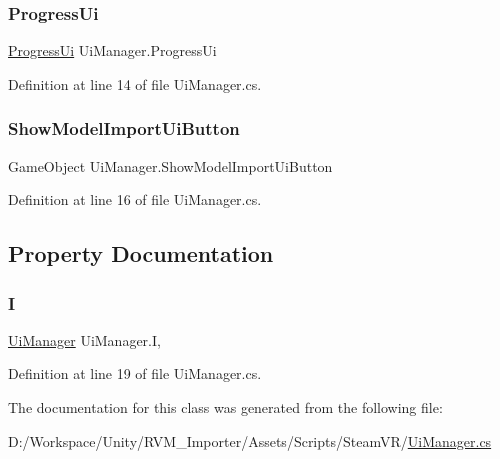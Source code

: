\subsubsection{\texorpdfstring{ProgressUi}{ProgressUi}}
{\footnotesize\ttfamily \mbox{\hyperlink{class_progress_ui}{Progress\+Ui}} Ui\+Manager.\+Progress\+Ui}



Definition at line 14 of file Ui\+Manager.\+cs.

\mbox{\label{class_ui_manager_a95546a510c301fc66886b8547799f979}} 
\subsubsection{\texorpdfstring{ShowModelImportUiButton}{ShowModelImportUiButton}}
{\footnotesize\ttfamily Game\+Object Ui\+Manager.\+Show\+Model\+Import\+Ui\+Button}



Definition at line 16 of file Ui\+Manager.\+cs.



\subsection{Property Documentation}
\mbox{\label{class_ui_manager_a26e1bd8ac1902121819f42a097f7f93b}} 
\subsubsection{\texorpdfstring{I}{I}}
{\footnotesize\ttfamily \mbox{\hyperlink{class_ui_manager}{Ui\+Manager}} Ui\+Manager.\+I\hspace{0.3cm}{\ttfamily [static]}, {\ttfamily [get]}}



Definition at line 19 of file Ui\+Manager.\+cs.



The documentation for this class was generated from the following file\+:\begin{DoxyCompactItemize}
\item 
D\+:/\+Workspace/\+Unity/\+R\+V\+M\+\_\+\+Importer/\+Assets/\+Scripts/\+Steam\+V\+R/\mbox{\hyperlink{_ui_manager_8cs}{Ui\+Manager.\+cs}}\end{DoxyCompactItemize}
